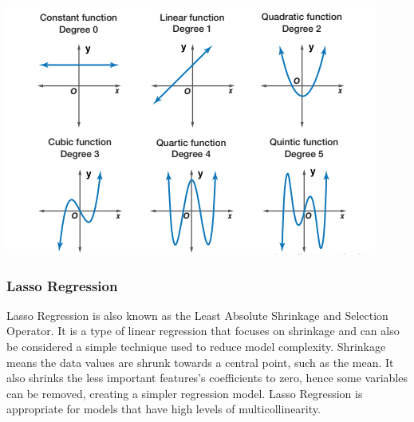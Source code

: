 \documentclass[a4paper,12pt]{report}
\begin{document}
\begin{center}
    \captionsetup{type=figure}
    \includegraphics[width=.9\linewidth]{media/functiondegrees.png}
    \label{fig:functiondegrees}
\end{center}

\subsubsection{Lasso Regression}
Lasso Regression is also known as the Least Absolute Shrinkage and Selection Operator. It is a type of linear regression that focuses on shrinkage and can also be considered a simple technique used to reduce model complexity. Shrinkage means the data values are shrunk towards a central point, such as the mean. It also shrinks the less important features’s coefficients to zero, hence some variables can be removed, creating a simpler regression model. Lasso Regression is appropriate for models that have high levels of multicollinearity. 
\end{document}
